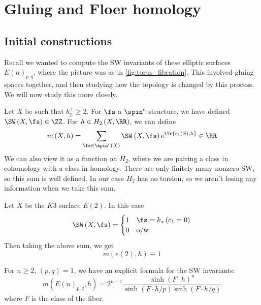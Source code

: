 \documentclass{amsart}
\begin{document}
\section{Gluing and Floer homology}

\subsection{Initial constructions}

Recall we wanted to compute the SW invariants of these elliptic surfaces
$E\left( n \right)_{p,q}$, where the picture was as in 
\cref{fig:torus_fibration}.
This involved gluing spaces together, and then studying how the topology
is changed by this process.
We will now study this more closely.

Let $X$ be such that $b_2^+ \geq 2$. 
For $\fs$ a $\spin^c$ structure, we have defined $\SW\left( X , \fs \right) \in \ZZ$. 
For $h\in H_2\left( X , \RR \right)$, we can define 
\begin{equation}
m\left( X , h \right) = \sum_{\fs\in \spin^c\left( X \right)} \SW\left( X , \fs \right) 
e^{\lr{c_1\left( S \right) , h}} \in \RR
\end{equation}
We can also view it as a function on $H_2$, where
we are pairing a class in cohomology with a class in homology.
There are only finitely many nonzero SW, so this sum is well defined. 
In our case $H_2$ has no torsion, so we aren't losing any information 
when we take this sum.

\begin{exm}
Let $X$ be the $K3$ surface $E\left( 2 \right)$. 
In this case 
\begin{equation}
\SW\left( X , \fs \right) = 
\begin{cases}
1 & \fs = k_x \left( c_1 = 0  \right) \\
0 & \text{o/w}
\end{cases}
\end{equation}
Then taking the above sum, we get
\begin{equation}
m\left( e\left( 2 \right) , h \right) \equiv 1
\end{equation}
\end{exm}

\begin{thm}
For $n\geq 2$, $\left( p,q \right) = 1$, we have an explicit formula for the SW invariants:
\begin{equation}
m\left( E\left( n \right)_{p,q} , h \right) = 
2^{n-1}\frac{
\sinh\left( F\cdot h \right)^n
}{
\sinh\left( F\cdot h / p \right)
\sinh\left( F\cdot h / q \right)}
\end{equation}
where $F$ is the class of the fiber.
\end{thm}
\end{document}
